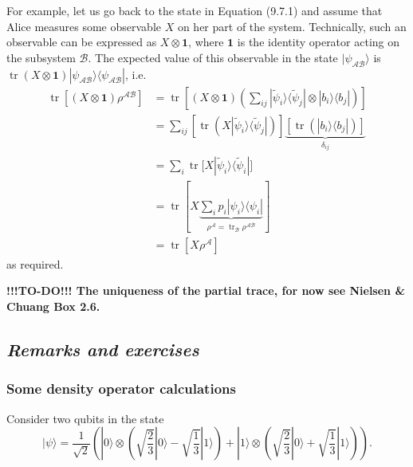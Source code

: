 \documentclass[fleqn]{article}
\begin{document}
For example, let us go back to the state in Equation (9.7.1) and assume that Alice measures some observable \(X\) on her part of the system.
Technically, such an observable can be expressed as \(X\otimes \mathbf{1}\), where \(\mathbf{1}\) is the identity operator acting on the subsystem \(\mathcal{B}\).
The expected value of this observable in the state \(|\psi_{\mathcal{AB}}\rangle\) is \(\operatorname{tr}(X\otimes\mathbf{1})|\psi_{\mathcal{AB}}\rangle\langle\psi_{\mathcal{AB}}|\), i.e.
\[
  \begin{aligned}
    \operatorname{tr}[(X\otimes \mathbf{1}) \rho^{\mathcal{AB}}]
    &= \operatorname{tr}\left[
        (X\otimes\mathbf{1}) \left(
          \sum_{ij} |\widetilde\psi_i\rangle\langle\widetilde\psi_j| \otimes |b_i\rangle\langle b_j|
        \right)
      \right]
  \\&= \sum_{ij} \left[
        \operatorname{tr}\left(X |\widetilde\psi_i\rangle\langle\widetilde\psi_j|\right)
      \right]
      \underbrace{\left[\operatorname{tr}\left(|b_i\rangle\langle b_j|\right)\right]}_{\delta_{ij}}
  \\&= \sum_i \operatorname{tr}\big[X |\widetilde\psi_i\rangle\langle\widetilde\psi_i|\big]
  \\&= \operatorname{tr}\left[
      X \underbrace{\sum_i p_i|\psi_i\rangle\langle\psi_i|}_{\rho^{\mathcal{A}} = \operatorname{tr}_{\mathcal{B}}\rho^{\mathcal{AB}}}
    \right]
  \\&= \operatorname{tr}[X\rho^{\mathcal{A}}]
  \end{aligned}
\]
as required.

\textbf{!!!TO-DO!!! The uniqueness of the partial trace, for now see Nielsen \& Chuang Box 2.6.}

\hypertarget{remarks-and-exercises-6}{%
\subsection{\texorpdfstring{\emph{Remarks and exercises}}{Remarks and exercises}}\label{remarks-and-exercises-6}}

\hypertarget{exercise31}{%
\subsubsection{Some density operator calculations}\label{exercise31}}

Consider two qubits in the state
\[
  |\psi\rangle =
  \frac{1}{\sqrt2}\left(
    |0\rangle\otimes\left(
      \sqrt{\frac23}|0\rangle
      - \sqrt{\frac13}|1\rangle
    \right)
    + |1\rangle\otimes\left(
      \sqrt{\frac23}|0\rangle
      + \sqrt{\frac13}|1\rangle
    \right)
  \right).
\]
\end{document}
